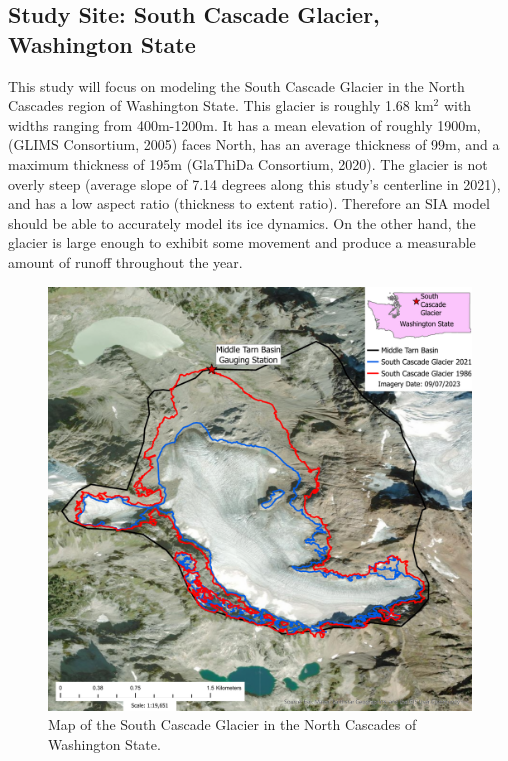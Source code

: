 \documentclass{article}
\begin{document}
\subsection{Study Site: South Cascade Glacier, Washington State}
This study will focus on modeling the South Cascade Glacier in the North Cascades region of Washington State. This glacier is 
roughly 1.68 km$^2$ with widths ranging from 400m-1200m. It has a mean elevation of roughly 1900m, (GLIMS Consortium, 2005) faces North, has 
an average thickness of 99m, and a maximum thickness of 195m (GlaThiDa Consortium, 2020). The glacier is 
not overly steep (average slope of 7.14 degrees along this study's centerline in 2021), and has a low aspect ratio 
(thickness to extent ratio). Therefore an SIA model should be able to accurately model its ice dynamics. On the other hand, 
the glacier is large enough to exhibit some movement and produce a measurable amount of runoff throughout the year.

\begin{figure}[h!]
    \centering
    \includegraphics[width=\textwidth]{Plots/SouthCascadeGlacierMap.pdf}
    \caption{Map of the South Cascade Glacier in the North Cascades of Washington State.}
    \label{fig:south_cascade_glacier}
\end{figure}
\FloatBarrier
\end{document}

